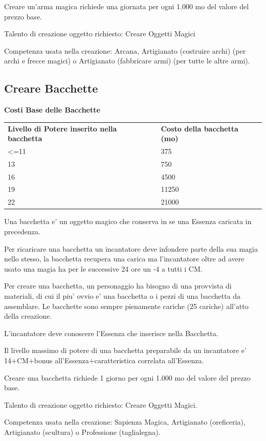 \documentclass[a4paper,11pt,twoside,openany]{book}
\begin{document}
{		Creare un'arma magica richiede una giornata per ogni 1.000 mo del valore del prezzo base.
		
		Talento di creazione oggetto richiesto: Creare Oggetti Magici
		
		Competenza usata nella creazione: Arcana, Artigianato (costruire archi) (per archi e frecce magici) o Artigianato (fabbricare armi) (per tutte le altre armi).
		
		\subsection{Creare Bacchette}
		
		\bigskip
		
		\textbf{Costi Base delle Bacchette}
		
		\begin{tabular}{ll}
			\toprule
			\textbf{Livello di Potere inserito nella bacchetta} & \textbf{Costo della bacchetta (mo)}\tabularnewline
			\textless=11 & 375\tabularnewline
			13 & 750\tabularnewline
			16 & 4500\tabularnewline
			19 & 11250\tabularnewline
			22 & 21000\tabularnewline
		\end{tabular}
		
		\bigskip
		
		Una bacchetta e' un oggetto magico che conserva in se una Essenza caricata in precedenza.
		
		Per ricaricare una bacchetta un incantatore deve infondere parte della sua magia nello stesso, la bacchetta recupera una carica ma l'incantatore oltre ad avere usato una magia ha per le successive 24 ore un -4 a tutti i CM.
		
		Per creare una bacchetta, un personaggio ha bisogno di una provvista di materiali, di cui il piu' ovvio e' una bacchetta o i pezzi di una bacchetta da assemblare. Le bacchette sono sempre pienamente cariche (25 cariche) all'atto della creazione.
		
		L'incantatore deve conoscere l'Essenza che inserisce nella Bacchetta.
		
		Il livello massimo di potere di una bacchetta preparabile da un incantatore e' 14+CM+bonus all'Essenza+caratteristica correlata all'Essenza.
		
		Creare una bacchetta richiede 1 giorno per ogni 1.000 mo del valore del prezzo base.
		
		Talento di creazione oggetto richiesto: Creare Oggetti Magici.
		
		Competenza usata nella creazione: Sapienza Magica, Artigianato (oreficeria),
		Artigianato (scultura) o Professione (taglialegna).
		
}
\end{document}
